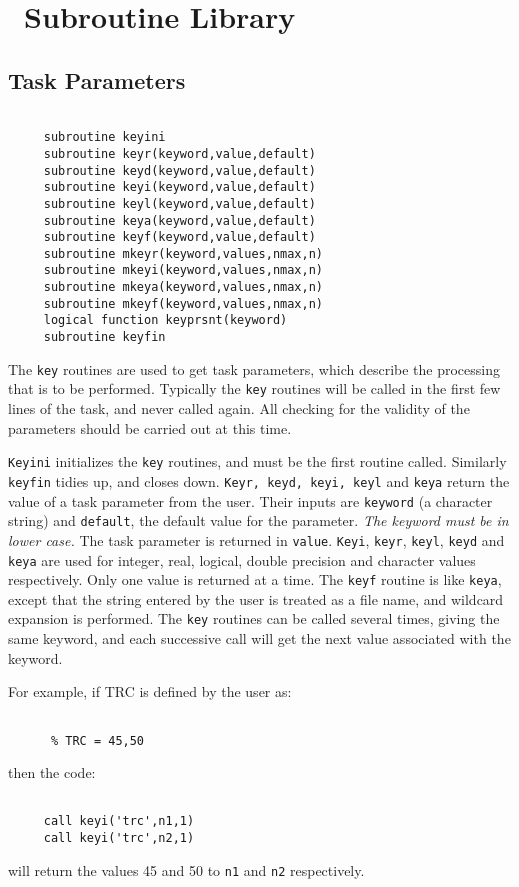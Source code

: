 \documentclass{report}
\begin{document}
\newchapter
\chapter{\miriad\ Subroutine Library}
\section{Task Parameters}
\begin{verbatim}

     subroutine keyini
     subroutine keyr(keyword,value,default)
     subroutine keyd(keyword,value,default)
     subroutine keyi(keyword,value,default)
     subroutine keyl(keyword,value,default)
     subroutine keya(keyword,value,default)
     subroutine keyf(keyword,value,default)
     subroutine mkeyr(keyword,values,nmax,n)
     subroutine mkeyi(keyword,values,nmax,n)
     subroutine mkeya(keyword,values,nmax,n)
     subroutine mkeyf(keyword,values,nmax,n)
     logical function keyprsnt(keyword)
     subroutine keyfin

\end{verbatim}
The {\tt key} routines are used to get task parameters, which describe the
processing that is to be performed.
Typically the {\tt key} routines
will be called in the first few lines of the task, and never called
again. All checking for the validity of the parameters should be
carried out at this time.

{\tt Keyini} initializes the {\tt key} routines, and must be the first
routine called. Similarly {\tt keyfin} tidies up, and closes down.
{\tt Keyr, keyd, keyi, keyl} and {\tt keya} return the value of a task parameter
from the user. Their inputs are {\tt keyword} (a character string) and
{\tt default}, the default value for the parameter. {\em The
keyword must be in lower case.} The task
parameter is returned in {\tt value}.
 {\tt Keyi}, {\tt keyr}, {\tt keyl}, {\tt keyd} and {\tt keya} are used
for integer, real, logical, double precision  and character values respectively.
Only one value is returned at a time.
The {\tt keyf} routine is like {\tt keya}, except that the string entered
by the user is treated as a file name, and wildcard expansion is performed.
The {\tt key} routines can be called several times, giving the same
keyword, and each successive call will get the next value associated
with the keyword.

For example, if TRC is defined by the user as:
\begin{verbatim}

      % TRC = 45,50

\end{verbatim}
then the code:
\begin{verbatim}

     call keyi('trc',n1,1)
     call keyi('trc',n2,1)

\end{verbatim}
will return the values 45 and 50 to {\tt n1} and {\tt n2} respectively.
\end{document}
